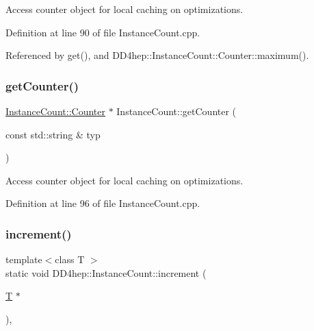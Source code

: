 Access counter object for local caching on optimizations. 



Definition at line 90 of file Instance\+Count.\+cpp.



Referenced by get(), and D\+D4hep\+::\+Instance\+Count\+::\+Counter\+::maximum().

\hypertarget{struct_d_d4hep_1_1_instance_count_ace5ceb5f2e95cb4c2a48cbd9edc3e84c}{}\label{struct_d_d4hep_1_1_instance_count_ace5ceb5f2e95cb4c2a48cbd9edc3e84c} 
\subsubsection{\texorpdfstring{get\+Counter()}{getCounter()}\hspace{0.1cm}{\footnotesize\ttfamily [2/2]}}
{\footnotesize\ttfamily \hyperlink{class_d_d4hep_1_1_instance_count_1_1_counter}{Instance\+Count\+::\+Counter} $\ast$ Instance\+Count\+::get\+Counter (\begin{DoxyParamCaption}\item[{const std\+::string \&}]{typ }\end{DoxyParamCaption})\hspace{0.3cm}{\ttfamily [static]}}



Access counter object for local caching on optimizations. 



Definition at line 96 of file Instance\+Count.\+cpp.

\hypertarget{struct_d_d4hep_1_1_instance_count_aaaf8d46a477863acc69b65afbab96b22}{}\label{struct_d_d4hep_1_1_instance_count_aaaf8d46a477863acc69b65afbab96b22} 
\subsubsection{\texorpdfstring{increment()}{increment()}\hspace{0.1cm}{\footnotesize\ttfamily [1/3]}}
{\footnotesize\ttfamily template$<$class T $>$ \\
static void D\+D4hep\+::\+Instance\+Count\+::increment (\begin{DoxyParamCaption}\item[{\hyperlink{class_t}{T} $\ast$}]{ }\end{DoxyParamCaption})\hspace{0.3cm}{\ttfamily [inline]}, {\ttfamily [static]}}



